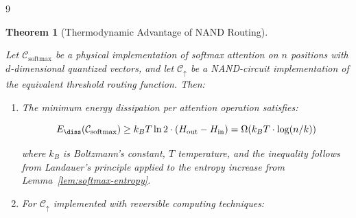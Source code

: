 \documentclass[11pt]{article}
\newtheorem{theorem}{Theorem}[section]
\theoremstyle{definition}
\newcommand{\softmax}{\operatorname{softmax}}
\newcommand{\nand}{\mathbin{\uparrow}}
\begin{document}
\begin{thebibliography}{9}
{{{\begin{theorem}[Thermodynamic Advantage of NAND Routing]






\label{thm:thermo-advantage}






Let $\mathcal{C}_{\softmax}$ be a physical implementation of softmax attention on $n$ positions with $d$-dimensional quantized vectors, and let $\mathcal{C}_{\nand}$ be a NAND-circuit implementation of the equivalent threshold routing function. Then:













\begin{enumerate}






    \item[(a)] The minimum energy dissipation per attention operation satisfies:






    \[






    E_{\diss}(\mathcal{C}_{\softmax}) \geq k_B T \ln 2 \cdot (H_{\text{out}} - H_{\text{in}}) = \Omega(k_B T \cdot \log(n/k))






    \]






    where $k_B$ is Boltzmann's constant, $T$ temperature, and the inequality follows from Landauer's principle applied to the entropy increase from Lemma~\ref{lem:softmax-entropy}.






    






    \item[(b)] For $\mathcal{C}_{\nand}$ implemented with reversible computing techniques:







\end{enumerate}
\end{theorem}}}}
\end{thebibliography}
\end{document}
